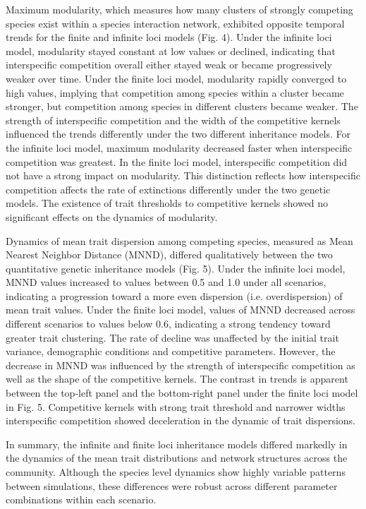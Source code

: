 \documentclass[12pt]{article}
\begin{document}
Maximum modularity, which measures how many clusters of strongly competing species exist within a species interaction network, exhibited opposite temporal trends for the finite and infinite loci models (Fig. 4). Under the infinite loci model, modularity stayed constant at low values or declined, indicating that interspecific competition overall either stayed weak or became progressively weaker over time. Under the finite loci model, modularity rapidly converged to high values, implying that competition among species within a cluster became stronger, but competition among species in different clusters became weaker. The strength of interspecific competition and the width of the competitive kernels influenced the trends differently under the two different inheritance models. For the infinite loci model, maximum modularity decreased faster when interspecific competition was greatest. In the finite loci model, interspecific competition did not have a strong impact on modularity. This distinction reflects how interspecific competition affects the rate of extinctions differently under the two genetic models. The existence of trait thresholds to competitive kernels showed no significant effects on the dynamics of modularity.\par

Dynamics of mean trait dispersion among competing species, measured as Mean Nearest Neighbor Distance (MNND), differed qualitatively between the two quantitative genetic inheritance models (Fig. 5). Under the infinite loci model, MNND values increased to values between 0.5 and 1.0 under all scenarios, indicating a progression toward a more even dispersion (i.e. overdispersion) of mean trait values. Under the finite loci model, values of MNND decreased across different scenarios to values below 0.6, indicating a strong tendency toward greater trait clustering. The rate of decline was unaffected by the initial trait variance, demographic conditions and competitive parameters. However, the decrease in MNND was influenced by the strength of interspecific competition as well as the shape of the competitive kernels. The contrast in trends is apparent between the top-left panel and the bottom-right panel under the finite loci model in Fig. 5. Competitive kernels with strong trait threshold and narrower widths interspecific competition showed deceleration in the dynamic of trait dispersions.\par

In summary, the infinite and finite loci inheritance models differed markedly in the dynamics of the mean trait distributions and network structures across the community. Although the species level dynamics show highly variable patterns between simulations, these differences were robust across different parameter combinations within each scenario. \par
\end{document}
